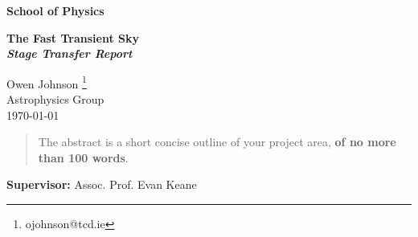 \documentclass[a4paper,12pt]{article}
\newcounter{daggerfootnote}
\newcommand*{\daggerfootnote}[1]{%
    \setcounter{daggerfootnote}{\value{footnote}}%
    \renewcommand*{\thefootnote}{\fnsymbol{footnote}}%
    \footnote[2]{#1}%
    \setcounter{footnote}{\value{daggerfootnote}}%
    \renewcommand*{\thefootnote}{\arabic{footnote}}%
    }
\begin{document}
\begin{minipage}[b]{110mm}
        {\LARGE\bf School of Physics %
        \vspace*{17mm}}
\end{minipage}
\hfill
\begin{minipage}[t]{40mm}               
\end{minipage}
\par\noindent                                           %
\vspace*{2cm}
\begin{center}
        \Large\bf The Fast Transient Sky\\
        \normalsize \textit{Stage Transfer Report}
\end{center}
\vspace*{1.5cm}
\begin{center}
        Owen Johnson\daggerfootnote{ojohnson@tcd.ie}\\ 
        Astrophysics Group\\ 
        \monthyeardate\today            %
\end{center}
\vspace*{5mm}
%
%                       
\begin{abstract}
        The abstract is a short concise outline of your 
        project area, {\bf of no more than 100 words}.
\end{abstract}

\vspace*{1cm}


\vfill
{\bf Supervisor:} Assoc. Prof. Evan Keane          
\newpage
\setcounter{page}{1}                            %
\footruleheight{1pt}
\headruleheight{1pt}
\rhead{ \thepage}
\cfoot{}
%
\tableofcontents  
\thispagestyle{empty}         
\newpage 
\end{document}
